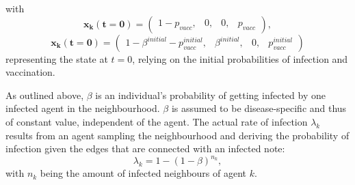 \documentclass[11pt]{article}
\begin{document}
with 
\begin{equation}\label{eq:4}
	\mathbf{x_{k}(t=0)}=\left(\begin{array}{cccc} 1-p_{vacc},&0,&0,&p_{vacc}  \end{array} \right),
\end{equation} 
\begin{equation}\label{eq:5}
	\mathbf{x_{k}(t=0)}=\left(\begin{array}{cccc} 1-\beta^{initial}-p_{vacc}^{initial} ,&\beta^{initial},&0,&p_{vacc}^{initial}  \end{array} \right)
\end{equation} 
representing the state at \(t=0\), relying on the initial probabilities of infection and vaccination. 


As outlined above, \(\beta\) is an individual's probability of getting infected by one infected agent in the neighbourhood. \(\beta\) is assumed to be disease-specific and thus of constant value, independent of the agent. The actual rate of infection \(\lambda_{k}\) results from an agent sampling the neighbourhood and deriving the probability of infection given the edges that are connected with an infected note: 
\begin{equation}\label{eq:6}
	\lambda_{k}=1-(1-\beta)^{n_{k}},
\end{equation}
with \(n_{k}\) being the amount of infected neighbours of agent \(k\). %
\end{document}

